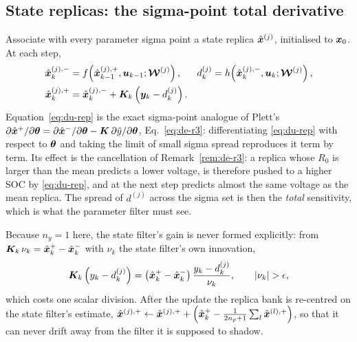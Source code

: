 \subsection{State replicas: the sigma-point total derivative}
Associate with every parameter sigma point a state replica $\hat{\bm{x}}^{(j)}$, initialised to
$\bm{x}_0$.  At each step,
\begin{align}
\hat{\bm{x}}^{(j),-}_k &= f\!\left(\hat{\bm{x}}^{(j),+}_{k-1},\bm{u}_{k-1};\bm{\mathcal{W}}^{(j)}\right), &
d^{(j)}_k &= h\!\left(\hat{\bm{x}}^{(j),-}_k,\bm{u}_k;\bm{\mathcal{W}}^{(j)}\right),
\label{eq:du-prop}\\
\hat{\bm{x}}^{(j),+}_k &= \hat{\bm{x}}^{(j),-}_k+\bm{K}_k\left(\bm{y}_k-d^{(j)}_k\right). &&
\label{eq:du-rep}
\end{align}
Equation~\eqref{eq:du-rep} is the exact sigma-point analogue of Plett's
$\partial\hat{\bm{x}}^{+}/\partial\bm{\theta}=\partial\hat{\bm{x}}^{-}/\partial\bm{\theta}-\bm{K}\,\partial\hat{y}/\partial\bm{\theta}$,
Eq.~\eqref{eq:de-r3}: differentiating \eqref{eq:du-rep} with respect to $\bm{\theta}$ and taking the
limit of small sigma spread reproduces it term by term.  Its effect is the cancellation of
Remark~\ref{rem:de-r3}: a replica whose $R_0$ is larger than the mean predicts a lower voltage, is
therefore pushed to a higher SOC by \eqref{eq:du-rep}, and at the next step predicts almost the same
voltage as the mean replica.  The spread of $d^{(j)}$ across the sigma set is then the \emph{total}
sensitivity, which is what the parameter filter must see.

Because $n_y=1$ here, the state filter's gain is never formed explicitly: from
$\bm{K}_k\,\nu_k=\hat{\bm{x}}^{+}_k-\hat{\bm{x}}^{-}_k$ with $\nu_k$ the state filter's own innovation,
\begin{equation}
\mK_k\left(y_k-d^{(j)}_k\right)=\left(\xplus_k-\xminus_k\right)\frac{y_k-d^{(j)}_k}{\nu_k},
\qquad |\nu_k|>\epsilon ,
\label{eq:du-gainfree}
\end{equation}
which costs one scalar division.  After the update the replica bank is re-centred on the state
filter's estimate,
$\hat{\bm{x}}^{(j),+}\leftarrow\hat{\bm{x}}^{(j),+}+\left(\hat{\bm{x}}^{+}_k-\tfrac{1}{2n_p+1}\sum_l\hat{\bm{x}}^{(l),+}\right)$,
so that it can never drift away from the filter it is supposed to shadow.

